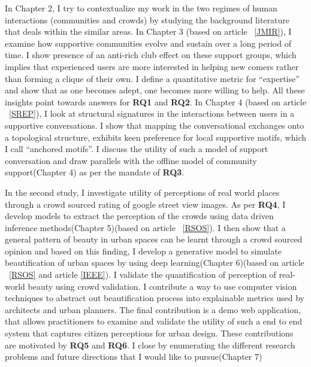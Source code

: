 In Chapter 2, I try to contextualize my work in the two regimes of human interactions (communities and crowds) by studying the background literature that deals within the similar areas.
In Chapter 3 (based on article ~\ref{JMIR}), I examine how supportive communities evolve and sustain over a long period of time. I show presence of an anti-rich club effect on these support groups, which implies that experienced users are more interested in helping new comers rather than forming a clique of their own. I define a quantitative metric for ``expertise'' and show that as one becomes adept, one becomes more willing to help. All these insights point towards answers for \textbf{RQ1} and \textbf{RQ2}. In Chapter 4 (based on article ~\ref{SREP}), I look at structural signatures in the interactions between users in a supportive conversations. I show that mapping the conversational exchanges onto a topological structure, exhibits keen preference for local supportive motifs, which I call ``anchored motifs''. I discuss the utility of such a model of support conversation and draw parallels with the offline model of community support(Chapter 4) as per the mandate of \textbf{RQ3}. 

In the second study, I investigate utility of perceptions of real world places through a crowd sourced rating of google street view images. As per \textbf{RQ4}, I develop models to extract the perception of the crowds using data driven inference methods(Chapter 5)(based on article ~\ref{RSOS}). 
I then show that a general pattern of beauty in urban spaces can be learnt through a crowd sourced opinion and based on this finding, I develop a generative model to simulate beautification of urban spaces by using deep learning(Chapter 6)(based on article ~\ref{RSOS} and article \ref{IEEE}). I validate the quantification of perception of real-world beauty using crowd validation. I contribute a way to use computer vision techniques to abstract out beautification process into explainable metrics used by architects and urban planners. The final contribution is a demo web application, that allows practitioners to examine and validate the utility of such a end to end system that captures citizen perceptions for urban design. These contributions are motivated by \textbf{RQ5} and \textbf{RQ6}. 
I close by enumerating the different research problems and future directions that I would like to pursue(Chapter 7)









